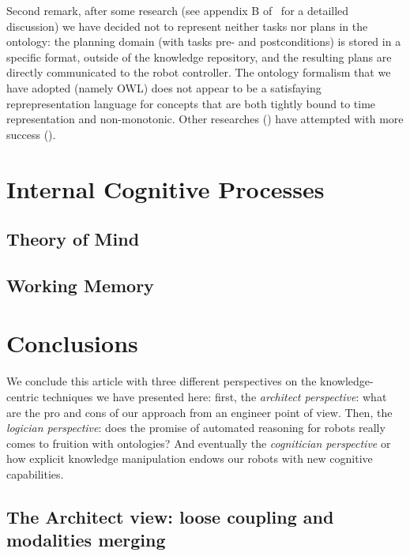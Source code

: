 \documentclass[letterpaper, 10 pt, conference]{ieeeconf}  %
\begin{document}
Second remark, after some research (see appendix B of~\cite{ma these} for a
detailled discussion)  we have decided not to represent neither tasks nor plans
in the ontology: the planning domain (with tasks pre- and postconditions) is
stored in a specific format, outside of the knowledge repository, and the
resulting plans are directly communicated to the robot controller. The ontology
formalism that we have adopted (namely OWL) does not appear to be a satisfaying
reprepresentation language for concepts that are both tightly bound to time
representation and non-monotonic. Other researches (\cite{tenorth...}) have attempted with more success ().

\section{Internal Cognitive Processes}
\label{sect|intern}

\subsection{Theory of Mind}

\cite{Warnier2012a}

\subsection{Working Memory}

\section{Conclusions}
\label{sect|conclusion}

We conclude this article with three different perspectives on the knowledge-centric
techniques we have presented here: first, the \emph{architect perspective}:
what are the pro and cons of our approach from an engineer point of view. Then,
the \emph{logician perspective}: does the promise of automated reasoning for
robots really comes to fruition with ontologies? And eventually the
\emph{cognitician perspective} or how explicit knowledge manipulation endows
our robots with new cognitive capabilities.

\subsection{The Architect view: loose coupling and modalities merging}
\end{document}
